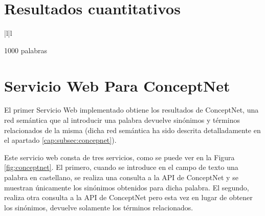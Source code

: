 \section{Resultados cuantitativos}
\label{cap:sec:pruebaCuantitativa}

\begin{table}
\centering
\begin{tabular}{|l|l}
	
	 {1000 palabras}\\ 
	
\end{tabular}
\end{table}

\section{Servicio Web Para ConceptNet}
\label{cap:sec:servicioConceptnet}

El primer Servicio Web implementado obtiene los resultados de ConceptNet, una red semántica que al introducir una palabra devuelve sinónimos y términos relacionados de la misma (dicha red semántica ha sido descrita detalladamente en el apartado \ref{cap:subsec:concepnet}).


Este servicio web consta de tres servicios, como se puede ver en la Figura \ref{fig:conceptnet}. El primero, cuando se introduce en el campo de texto una palabra en castellano, se realiza una consulta a la API de ConceptNet y se muestran únicamente los sinónimos obtenidos para dicha palabra. El segundo, realiza otra consulta a la API de ConceptNet pero esta vez en lugar de obtener los sinónimos, devuelve solamente los términos relacionados.

